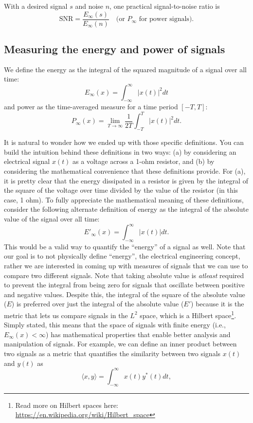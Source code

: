 With a desired signal $s$ and noise $n$, one practical signal-to-noise ratio is
\[
\mathrm{SNR}=\frac{E_\infty(s)}{E_\infty(n)}\quad \text{(or }P_\infty\text{ for power signals)}.
\]


\subsection{Measuring the energy and power of signals}
We define the energy as the integral of the squared magnitude of a signal over all time:
\[E_\infty(x) = \int_{-\infty}^{\infty} |x(t)|^2 dt
\]
and power as the time-averaged measure for a time period $[-T, T]$:
\[
P_\infty(x) = \lim_{T \to \infty} \frac{1}{2T} \int_{-T}^{T} |x(t)|^2 dt.
\]

It is natural to wonder how we ended up with those specific definitions. You can build the intuition behind these definitions in two ways: (a) by considering an electrical signal $x(t)$ as a voltage across a 1-ohm resistor, and (b) by considering the mathematical convenience that these definitions provide. For (a), it is pretty clear that the energy dissipated in a resistor is given by the integral of the square of the voltage over time divided by the value of the resistor (in this case, 1 ohm). To fully appreciate the mathematical meaning of these definitions, consider the following alternate definition of energy as the integral of the absolute value of the signal over all time:
\[
E'_\infty(x) = \int_{-\infty}^{\infty} |x(t)| dt.
\]
This would be a valid way to quantify the ``energy'' of a signal as well. Note that our goal is to not physically define ``energy'', the electrical engineering concept, rather we are interested in coming up with measures of signals that we can use to compare two different signals. Note that taking absolute value is \textit{atleast} required to prevent the integral from being zero for signals that oscillate between positive and negative values. Despite this, the integral of the square of the absolute value ($E$) is preferred over just the integral of the absolute value ($E'$) because it is the metric that lets us compare signals in the $L^2$ space, which is a Hilbert space\footnote{Read more on Hilbert spaces here: \url{https://en.wikipedia.org/wiki/Hilbert_space}}. Simply stated, this means that the space of signals with finite energy (i.e., $E_\infty(x) < \infty$) has mathematical properties that enable better analysis and manipulation of signals. For example, we can define an inner product between two signals as a metric that quantifies the similarity between two signals $x(t)$ and $y(t)$ as \[
\langle x, y \rangle = \int_{-\infty}^{\infty} x(t) y^*(t) dt,
\]

